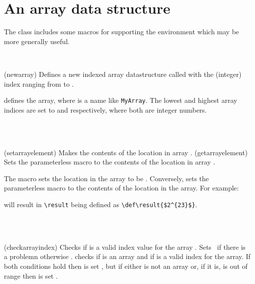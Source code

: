 \section{An array data structure}

   The class includes some macros for supporting the 
environment which may be more generally useful. 

\begin{syntax}
\cmd{\newarray} \\
\end{syntax}
\glossary(newarray)%
  {}%
  {Defines a new indexed array datastructure called 
  with the (integer) index ranging from  to .}
 
\cmd{\newarray} defines
the  array, where  is a name like
\texttt{MyArray}. The lowest and highest array indices are set to
 and  respectively, where both are integer numbers.

\begin{syntax}
\cmd{\setarrayelement} \\
\cmd{\getarrayelement} \\
\end{syntax}
\glossary(setarrayelement)%
  {}%
  {Makes  the contents of the  location in 
   array .}
\glossary(getarrayelement)%
  {}%
  {Sets the parameterless macro  to the contents of 
   the  location in array .}

The \cmd{\setarrayelement} macro
sets the  location in the  array to be 
. Conversely, \cmd{\getarrayelement} sets the parameterless
macro  to the contents of
the  location in the  array. 
For example: 
\begin{lcode}
\end{lcode}
will result in \verb?\result? being defined as \verb?\def\result{$2^{23}$}?.

\begin{syntax}
\cmd{\checkarrayindex} \\
 \\
\end{syntax}
\glossary(checkarrayindex)%
  {}%
  {Checks if  is a valid index value for the array 
   . Sets  \ptrue\ if there is a problemn
   otherwise \pfalse.}
\cmd{\checkarrayindex} checks if
 is an array and if  is a valid index for
the array. If both conditions hold then  is set
\pfalse, but if either  is not an array or, if it is,
 is out of range then  is set \ptrue.

